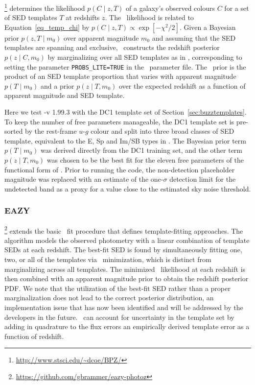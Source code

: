 \bpz \footnote{\url{http://www.stsci.edu/~dcoe/BPZ/}} \citep[Bayesian Photometric Redshift,][]{Benitez:00} determines the likelihood $p(C \mid z, T)$ of a galaxy's observed colours $C$ for a set of SED templates $T$ at redshifts $z$.
The \bpz\ likelihood is related to Equation~\ref{eq_temp_chi} by $p(C \mid z, T) \propto \exp[- \chi^{2} / 2]$.
Given a Bayesian prior $p(z, T \mid m_{0})$ over apparent magnitude $m_0$ and assuming that the SED templates are spanning and exclusive, \bpz\ constructs the redshift posterior $p(z \mid C, m_0)$ by marginalizing over all SED templates as in \citep[Eq.~3 from][]{Benitez:00}, corresponding to setting the parameter \texttt{PROBS\_LITE=TRUE} in the \bpz\ parameter file.
The \bpz\ prior is the product of an SED template proportion that varies with apparent magnitude $p(T \mid m_{0})$ and a prior $p(z \mid T, m_{0})$ over the expected redshift as a function of apparent magnitude and SED template.

Here we test \bpz-v 1.99.3 with the DC1 template set of Section~\ref{sec:buzztemplates}.
To keep the number of free parameters manageable, the DC1 template set is pre-sorted by the rest-frame $u$-$g$ colour and split into three broad classes of SED template, equivalent to the E, Sp and Im/SB types in .
The Bayesian prior term $p(T \mid m_{0})$ was derived directly from the DC1 training set, and the other term $p(z \mid T, m_{0})$ was chosen to be the best fit for the eleven free parameters of the functional form of \citet{Benitez:00}.
Prior to running the code, the non-detection placeholder magnitude was replaced with an estimate of the one-$\sigma$ detection limit for the undetected band as a proxy for a value close to the estimated sky noise threshold.

\subsubsection{EAZY}
\label{sec:eazy}

\eazy \footnote{\url{https://github.com/gbrammer/eazy-photoz}} \citep[Easy and Accurate Photometric Redshifts from Yale,][]{Brammer:08} extends the basic \chisq\ fit procedure that defines template-fitting approaches.
The algorithm models the observed photometry with a linear combination of template SEDs at each redshift.
The best-fit SED is found by simultaneously fitting one, two, or all of the templates via \chisq\ minimization, which is distinct from marginalizing across all templates.
The minimized \chisq\ likelihood at each redshift is then combined with an apparent magnitude prior to obtain the redshift posterior PDF.
We note that the utilization of the best-fit SED rather than a proper marginalization does not lead to the correct posterior distribution, an implementation issue that has now been identified and will be addressed by the developers in the future.
\eazy\ can account for uncertainty in the template set by adding in quadrature to the flux errors an empirically derived template error as a function of redshift.

